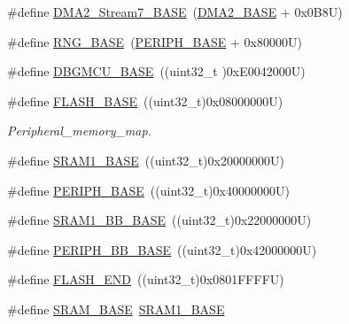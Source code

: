 \begin{DoxyCompactItemize}
\item 
\#define \hyperlink{group___peripheral__registers__structures_gaa9faa708ad2440d24eb1064cba9bb06d}{D\+M\+A2\+\_\+\+Stream7\+\_\+\+B\+A\+SE}~(\hyperlink{group___peripheral__memory__map_gab72a9ae145053ee13d1d491fb5c1df64}{D\+M\+A2\+\_\+\+B\+A\+SE} + 0x0\+B8\+U)
\item 
\#define \hyperlink{group___peripheral__registers__structures_gab92662976cfe62457141e5b4f83d541c}{R\+N\+G\+\_\+\+B\+A\+SE}~(\hyperlink{group___peripheral__memory__map_ga9171f49478fa86d932f89e78e73b88b0}{P\+E\+R\+I\+P\+H\+\_\+\+B\+A\+SE} + 0x80000\+U)
\item 
\#define \hyperlink{group___peripheral__registers__structures_ga4adaf4fd82ccc3a538f1f27a70cdbbef}{D\+B\+G\+M\+C\+U\+\_\+\+B\+A\+SE}~((uint32\+\_\+t )0x\+E0042000\+U)
\item 
\#define \hyperlink{group___peripheral__registers__structures_ga23a9099a5f8fc9c6e253c0eecb2be8db}{F\+L\+A\+S\+H\+\_\+\+B\+A\+SE}~((uint32\+\_\+t)0x08000000\+U)
\begin{DoxyCompactList}\small\item\em Peripheral\+\_\+memory\+\_\+map. \end{DoxyCompactList}\item 
\#define \hyperlink{group___peripheral__registers__structures_ga7d0fbfb8894012dbbb96754b95e562cd}{S\+R\+A\+M1\+\_\+\+B\+A\+SE}~((uint32\+\_\+t)0x20000000\+U)
\item 
\#define \hyperlink{group___peripheral__registers__structures_ga9171f49478fa86d932f89e78e73b88b0}{P\+E\+R\+I\+P\+H\+\_\+\+B\+A\+SE}~((uint32\+\_\+t)0x40000000\+U)
\item 
\#define \hyperlink{group___peripheral__registers__structures_gac4c4f61082e4b168f29d9cf97dc3ca5c}{S\+R\+A\+M1\+\_\+\+B\+B\+\_\+\+B\+A\+SE}~((uint32\+\_\+t)0x22000000\+U)
\item 
\#define \hyperlink{group___peripheral__registers__structures_gaed7efc100877000845c236ccdc9e144a}{P\+E\+R\+I\+P\+H\+\_\+\+B\+B\+\_\+\+B\+A\+SE}~((uint32\+\_\+t)0x42000000\+U)
\item 
\#define \hyperlink{group___peripheral__registers__structures_ga8be554f354e5aa65370f6db63d4f3ee4}{F\+L\+A\+S\+H\+\_\+\+E\+ND}~((uint32\+\_\+t)0x0801\+F\+F\+F\+F\+U)
\item 
\#define \hyperlink{group___peripheral__registers__structures_ga05e8f3d2e5868754a7cd88614955aecc}{S\+R\+A\+M\+\_\+\+B\+A\+SE}~\hyperlink{group___peripheral__memory__map_ga7d0fbfb8894012dbbb96754b95e562cd}{S\+R\+A\+M1\+\_\+\+B\+A\+SE}
\item 

\end{DoxyCompactItemize}
